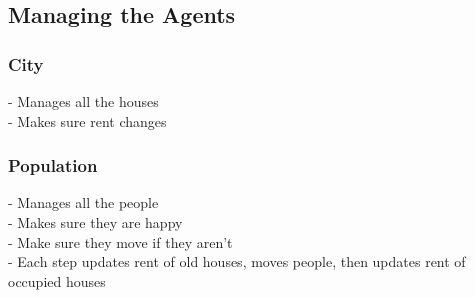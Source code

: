 \subsection{Managing the Agents}
\subsubsection{City}
\par
- Manages all the houses \\
- Makes sure rent changes \\

\subsubsection{Population}
\par
- Manages all the people \\
- Makes sure they are happy \\
- Make sure they move if they aren't \\
- Each step updates rent of old houses, moves people, then updates rent of occupied houses \\